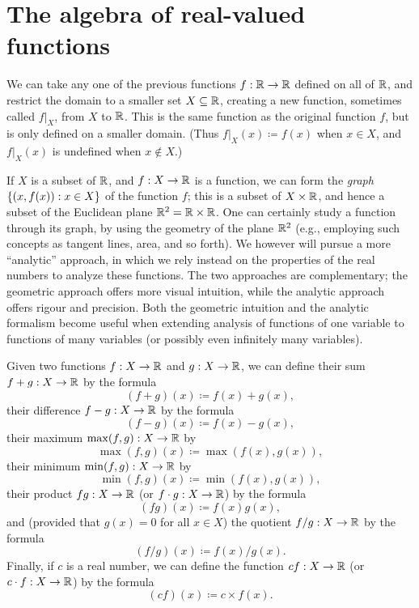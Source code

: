 \section{The algebra of real-valued functions}\label{sec:9.2}

\begin{note}
  We can take any one of the previous functions \(f : \mathbb{R} \to \mathbb{R}\) defined on all of \(\mathbb{R}\), and restrict the domain to a smaller set \(X \subseteq \mathbb{R}\), creating a new function, sometimes called \(f|_X\), from \(X\) to \(\mathbb{R}\).
  This is the same function as the original function \(f\), but is only defined on a smaller domain.
  (Thus \(f|_X(x) \coloneqq f(x)\) when \(x \in X\), and \(f|_X(x)\) is undefined when \(x \notin X\).)
\end{note}

\begin{note}
  If \(X\) is a subset of \(\mathbb{R}\), and \(f : X \to \mathbb{R}\) is a function, we can form the \emph{graph} \(\left\lbrace(x, f(x)) : x \in X\right\rbrace\) of the function \(f\);
  this is a subset of \(X \times \mathbb{R}\), and hence a subset of the Euclidean plane \(\mathbb{R}^2 = \mathbb{R} \times \mathbb{R}\).
  One can certainly study a function through its graph, by using the geometry of the plane \(\mathbb{R}^2\)
  (e.g., employing such concepts as tangent lines, area, and so forth).
  We however will pursue a more ``analytic'' approach, in which we rely instead on the properties of the real numbers to analyze these functions.
  The two approaches are complementary;
  the geometric approach offers more visual intuition, while the analytic approach offers rigour and precision.
  Both the geometric intuition and the analytic formalism become useful when extending analysis of functions of one variable to functions of many variables
  (or possibly even infinitely many variables).
\end{note}

\begin{defn}\label{9.2.1}
  Given two functions \(f : X \to \mathbb{R}\) and \(g : X \to \mathbb{R}\), we can define their sum \(f + g : X \to \mathbb{R}\) by the formula
  \[
    (f + g)(x) \coloneqq f(x) + g(x),
  \]
  their difference \(f - g : X \to \mathbb{R}\) by the formula
  \[
    (f - g)(x) \coloneqq f(x) - g(x),
  \]
  their maximum \(\max(f, g) : X \to \mathbb{R}\) by
  \[
    \max(f, g)(x) \coloneqq \max(f(x), g(x)),
  \]
  their minimum \(\min(f, g) : X \to \mathbb{R}\) by
  \[
    \min(f, g)(x) \coloneqq \min(f(x), g(x)),
  \]
  their product \(fg : X \to \mathbb{R}\) (or \(f \cdot g : X \to \mathbb{R}\)) by the formula
  \[
    (fg)(x) \coloneqq f(x)g(x),
  \]
  and (provided that \(g(x) = 0\) for all \(x \in X\)) the quotient \(f / g : X \to \mathbb{R}\) by the formula
  \[
    (f / g)(x) \coloneqq f(x) / g(x).
  \]
  Finally, if \(c\) is a real number, we can define the function \(cf : X \to \mathbb{R}\) (or \(c \cdot f : X \to \mathbb{R}\)) by the formula
  \[
    (cf)(x) \coloneqq c \times f(x).
  \]
\end{defn}

